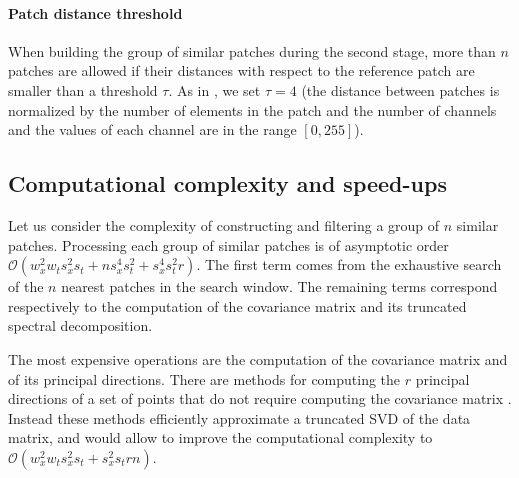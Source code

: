 \documentclass[10pt, a4paper]{article}
\begin{document}

\paragraph{Patch distance threshold} When building the group of similar
patches during the second stage, more than $n$ patches are allowed
if their distances with respect to the reference patch are smaller than a
threshold $\tau$.  As in \cite{Lebrun2013ipol}, we set $\tau = 4$ (the distance between
patches is normalized by the number of elements in the patch and the number of
channels and the values of each channel are in the range  $[0,255]$).


\subsection{Computational complexity and speed-ups}
\label{sse:complexity}

Let us consider the complexity of constructing and filtering a group of
$n$ similar patches.
Processing each group of similar patches is of asymptotic order $\mathcal
O(w_x^2 w_t s_x^2 s_t + ns_x^4s_t^2 + s_x^4s_t^2r)$.
The first term comes from the exhaustive search of the $n$ nearest patches in
the search window.  The remaining terms correspond respectively to the
computation of the covariance matrix and its truncated spectral decomposition.

The most expensive operations are the computation of the covariance matrix and
of its principal directions.
There are methods for computing the $r$ principal directions
of a set of points that do not require computing the covariance matrix
\cite{Halko2011}. Instead these methods efficiently approximate a truncated SVD
of the data matrix, and would 
allow to improve the computational complexity to $\mathcal O(w_x^2 w_t s_x^2
s_t + s_x^2s_trn)$.
\end{document}
